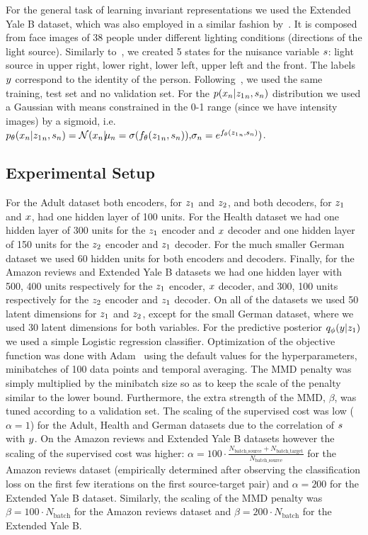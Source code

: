 For the general task of learning invariant representations we used the Extended Yale B dataset, which was also employed in a similar fashion by~\citet{li2014learning}. It is composed from face images of 38 people under different lighting conditions (directions of the light source). Similarly to~\citet{li2014learning}, we created 5 states for the nuisance variable $\*s$: light source in upper right, lower right, lower left, upper left and the front. The labels $\*y$ correspond to the identity of the person. Following~\citet{li2014learning}, we used the same training, test set and no validation set. For the $p(\*x_n|{\*z_1}_n, \*s_n)$ distribution we used a Gaussian with means constrained in the 0-1 range (since we have intensity images) by a sigmoid, i.e. $p_\theta(\*x_n|{\*z_1}_n, \*s_n) = \mathcal{N}(\*x_n| \!\mu_n = \sigma(f_\theta({\*z_1}_n, \*s_n)), \!\sigma_n = e^{f_\theta({\*z_1}_n, \*s_n)})$.
 \subsection{Experimental Setup}
For the Adult dataset both encoders, for $\*z_1$ and $\*z_2$, and both decoders, for $\*z_1$ and $\*x$, had one hidden layer of 100 units. For the Health dataset we had one hidden layer of 300 units for the $\*z_1$ encoder and $\*x$ decoder and one hidden layer of 150 units for the $\*z_2$ encoder and $\*z_1$ decoder. For the much smaller German dataset we used 60 hidden units for both encoders and decoders. Finally, for the Amazon reviews and Extended Yale B datasets we had one hidden layer with 500, 400 units respectively for the $\*z_1$ encoder, $\*x$ decoder, and 300, 100 units respectively for the $\*z_2$ encoder and $\*z_1$ decoder. On all of the datasets we used 50 latent dimensions for $\*z_1$ and $\*z_2$, except for the small German dataset, where we used 30 latent dimensions for both variables. For the predictive posterior $q_\phi(\*y|\*z_1)$ we used a simple Logistic regression classifier. Optimization of the objective function was done with Adam~\citep{DBLP:journals/corr/KingmaB14} using the default values for the hyperparameters, minibatches of 100 data points and temporal averaging. The MMD penalty was simply multiplied by the minibatch size so as to keep the scale of the penalty similar to the lower bound. Furthermore, the extra strength of the MMD, $\beta$, was tuned according to a validation set. The scaling of the supervised cost was low ($\alpha = 1 $) for the Adult, Health and German datasets due to the correlation of $\*s$ with $\*y$. On the Amazon reviews and Extended Yale B datasets however the scaling of the supervised cost was higher: $\alpha = 100 \cdot \frac{N_{\text{batch\_source}} + N_{\text{batch\_target}}}{N_{\text{batch\_source}}}$ for the Amazon reviews dataset (empirically determined after observing the classification loss on the first few iterations on the first source-target pair) and $\alpha = 200$ for the Extended Yale B dataset. Similarly, the scaling of the MMD penalty was $\beta = 100 \cdot N_{\text{batch}}$ for the Amazon reviews dataset and $\beta = 200 \cdot N_{\text{batch}}$ for the Extended Yale B.

